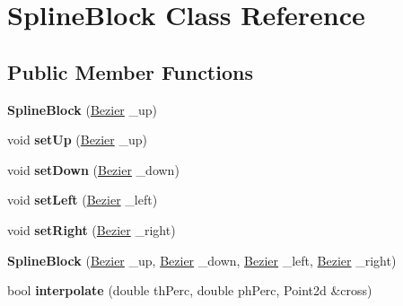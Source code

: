 \hypertarget{class_spline_block}{}\section{Spline\+Block Class Reference}
\label{class_spline_block}
\subsection*{Public Member Functions}
\begin{DoxyCompactItemize}
\item 
\mbox{\label{class_spline_block_a1a7fe2fecfa436df8d3950a14d884945}} 
{\bfseries Spline\+Block} (\mbox{\hyperlink{class_bezier}{Bezier}} \+\_\+up)
\item 
\mbox{\label{class_spline_block_a8564a7022d5645da80faa924c7b04a80}} 
void {\bfseries set\+Up} (\mbox{\hyperlink{class_bezier}{Bezier}} \+\_\+up)
\item 
\mbox{\label{class_spline_block_ac7fb52d5564f0dbcd6ff36a8fa136e77}} 
void {\bfseries set\+Down} (\mbox{\hyperlink{class_bezier}{Bezier}} \+\_\+down)
\item 
\mbox{\label{class_spline_block_ac8a74fa8278a47c462f8eafe46ca8d6f}} 
void {\bfseries set\+Left} (\mbox{\hyperlink{class_bezier}{Bezier}} \+\_\+left)
\item 
\mbox{\label{class_spline_block_a75ad87086f51cad313a908dc8b777cf0}} 
void {\bfseries set\+Right} (\mbox{\hyperlink{class_bezier}{Bezier}} \+\_\+right)
\item 
\mbox{\label{class_spline_block_a720699366455181c54370100548fe6a8}} 
{\bfseries Spline\+Block} (\mbox{\hyperlink{class_bezier}{Bezier}} \+\_\+up, \mbox{\hyperlink{class_bezier}{Bezier}} \+\_\+down, \mbox{\hyperlink{class_bezier}{Bezier}} \+\_\+left, \mbox{\hyperlink{class_bezier}{Bezier}} \+\_\+right)
\item 
\mbox{\label{class_spline_block_a1c7f706934984b31c258046d2e42bc87}} 
bool {\bfseries interpolate} (double th\+Perc, double ph\+Perc, Point2d \&cross)
\item 
\mbox{\label{class_spline_block_a9b04893377c02c47ac82e19c880cb186}} 

\end{DoxyCompactItemize}
